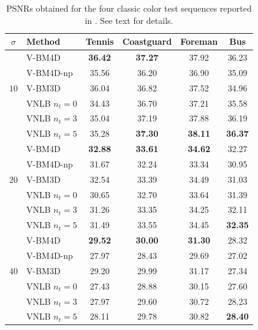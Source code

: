 \documentclass{llncs}
\newcommand{\best}[1]{\textbf{#1}}
\begin{document}
\begin{table}[htp!]
	\begin{center}
	\renewcommand{\tabcolsep}{3mm}
	\renewcommand{\arraystretch}{1.0}
	\begin{tabular}{ c | l |c c c c}
		\hline
		\rule{0pt}{12pt}$\sigma$ & Method     & Tennis       & Coastguard   & Foreman      & Bus          \\\hline
		\multirow{5}{*}{$10$} & V-BM4D \cite{Maggioni2012}       & \best{36.42} & \best{37.27} &       37.92  &       36.23  \\
		                      & V-BM4D-np     &       35.56  &       36.20  &       36.90  &       35.09  \\
		                      & V-BM3D        &       36.04  &       36.82  &       37.52  &       34.96  \\
		                      & VNLB $n_t = 0$ &       34.43  &       36.70  &       37.21  &       35.58  \\
		                      & VNLB $n_t = 3$ &       35.04  &       37.19  &       37.88  &       36.19  \\
									 & VNLB $n_t = 5$ &       35.28  & \best{37.30} & \best{38.11} & \best{36.37} \\\hline
%									 
		\multirow{5}{*}{$20$} & V-BM4D  \cite{Maggioni2012}       & \best{32.88} & \best{33.61} & \best{34.62} &       32.27  \\
		                      & V-BM4D-np     &       31.67  &       32.24  &       33.34  &       30.95  \\
		                      & V-BM3D        &       32.54  &       33.39  &       34.49  &       31.03  \\
		                      & VNLB $n_t = 0$ &       30.65  &       32.70  &       33.64  &       31.39  \\
									 & VNLB $n_t = 3$ &       31.26  &       33.35  &       34.25  &       32.11  \\
									 & VNLB $n_t = 5$ &       31.49  &       33.55  &       34.45  & \best{32.35} \\\hline
%									 
		\multirow{5}{*}{$40$} & V-BM4D   \cite{Maggioni2012}      & \best{29.52} & \best{30.00} & \best{31.30} &       28.32  \\
		                      & V-BM4D-np     &       27.97  &       28.43  &       29.69  &       27.02  \\
		                      & V-BM3D        &       29.20  &       29.99  &       31.17  &       27.34  \\
		                      & VNLB $n_t = 0$ &       27.43  &       28.88  &       30.15  &       27.60  \\
									 & VNLB $n_t = 3$ &       27.97  &       29.60  &       30.72  &       28.23  \\
									 & VNLB $n_t = 5$ &       28.11  &       29.78  &       30.82  & \best{28.40} \\\hline
	\end{tabular}
	\end{center}
	\caption{PSNRs obtained for the four classic color test sequences reported in
	\cite{Maggioni2012}. See text for details.}
	\label{tab:psnr}
\end{table}
\end{document}

